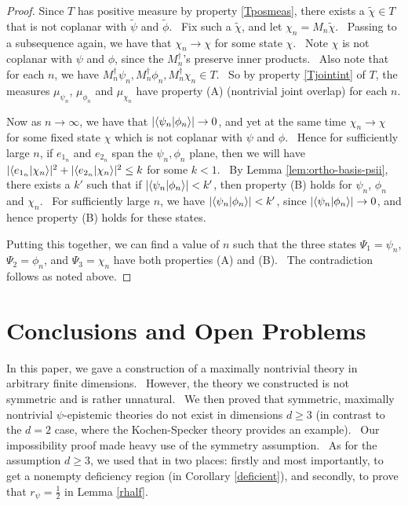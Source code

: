 \documentclass[letterpaper,12pt]{article}
\newcommand{\braket}[2]{\mbox{$ \langle #1 | #2 \rangle $}}
\begin{document}
\begin{proof}
Since $T$ has positive measure by property \ref{Tposmeas}, there exists a $\tilde{\chi} \in T$ that is not coplanar with $\tilde{\psi}$ and $\tilde{\phi}$. \ Fix such a $\tilde{\chi}$, and let $\chi_n = M_n \tilde{\chi}$. \ Passing to a subsequence again, we have that $\chi_n \rightarrow \chi$ for some state $\chi$. \ Note $\chi$ is not coplanar with $\psi$ and $\phi$, since the $M_n^\dagger$'s preserve inner products. \ Also note that for each $n$, we have $M_n^\dagger \psi_n, M_n^\dagger \phi_n, M_n^\dagger \chi_n \in T$. \ So by property \ref{Tjointint} of $T$, the measures $\mu_{\psi_n}$, $\mu_{\phi_n}$ and $\mu_{\chi_n}$ have property (A) (nontrivial joint overlap) for each $n$.

Now as $n\rightarrow \infty$, we have that $|\braket{\psi_n}{\phi_n}| \rightarrow 0$, and yet at the same time $\chi_n \rightarrow \chi$ for some fixed state $\chi$ which is not coplanar with $\psi$ and $\phi$. \ Hence for sufficiently large $n$, if $e_{1_n}$ and $e_{2_n}$ span the $\psi_n,\phi_n$ plane, then we will have $|\braket{e_{1_n}}{\chi_n}|^2+|\braket{e_{2_n}}{\chi_n}|^2\leq k$ for some $k<1$. \ By Lemma \ref{lem:ortho-basis-psii}, there exists a $k'$ such that if $|\braket{\psi_n}{\phi_n}|<k'$, then property (B) holds for $\psi_n$, $\phi_n$ and $\chi_n$. \ For sufficiently large $n$, we have $|\braket{\psi_n}{\phi_n}|<k'$, since $|\braket{\psi_n}{\phi_n}|\rightarrow 0$, and hence property (B) holds for these states.

Putting this together, we can find a value of $n$ such that the three states $\Psi_1=\psi_n$, $\Psi_2=\phi_n$, and $\Psi_3=\chi_n$ have both properties (A) and (B). \ The contradiction follows as noted above.

\end{proof}


\section{Conclusions and Open Problems}
\label{sec-conclusion}
In this paper, we gave a construction of a maximally nontrivial theory
in arbitrary finite dimensions. \ However, the theory we constructed is not
symmetric and is rather unnatural. \ We then proved that symmetric, maximally
nontrivial $\psi$-epistemic theories do not exist in dimensions $d\geq 3$ (in contrast to the $d=2$ case,
where the Kochen-Specker theory provides an example). \ Our impossibility
proof made heavy use of the symmetry assumption. \ As for the assumption $d\geq 3$, we
used that in two places: firstly and most importantly, to get a nonempty deficiency region (in Corollary \ref{deficient}), and secondly, to prove that $r_{\psi}=\frac{1}{2}$ in Lemma \ref{rhalf}.
\end{document}
